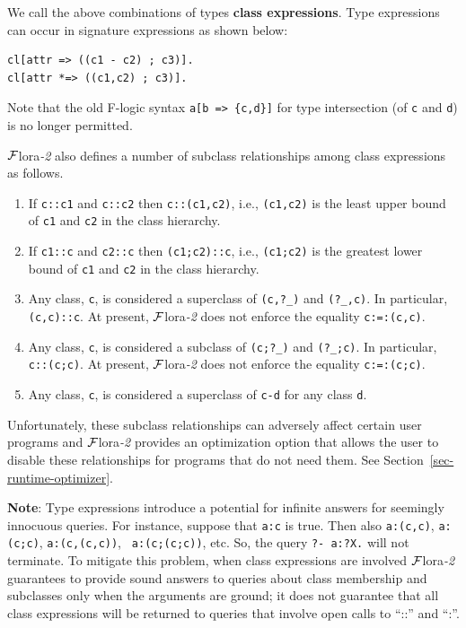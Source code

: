 \documentclass[11pt]{article}
\newcommand{\Mvd}{{\mbox{\tt \,=>\,}}}  %
\newcommand{\FLORA}{{\mbox{\sc ${\cal F}${lora}\rm\emph{-2}}}\xspace}
\newcommand{\fl}{\mbox{F-logic}\xspace}
\begin{document}
We call the above combinations of types {\bf class expressions}.  
Type expressions can occur in signature expressions as shown below:
\begin{verbatim}
cl[attr => ((c1 - c2) ; c3)].
cl[attr *=> ((c1,c2) ; c3)].
\end{verbatim}
Note that the old \fl syntax {\tt a[b\Mvd \{c,d\}]} for type intersection
(of {\tt c} and {\tt d}) is no longer permitted.

\FLORA also defines a number of subclass relationships among class
expressions as follows.
\begin{enumerate}
\item If {\tt c::c1} and {\tt c::c2} then {\tt c::(c1,c2)}, i.e.,
  {\tt (c1,c2)} is the least upper bound of {\tt c1} and {\tt c2} in the
  class hierarchy.
\item If {\tt c1::c} and {\tt c2::c} then {\tt (c1;c2)::c}, i.e.,
  {\tt (c1;c2)} is the greatest lower bound of {\tt c1} and {\tt c2} in the
  class hierarchy. 
\item Any class, {\tt c}, is considered a superclass of {\tt (c,?\_)} and
  {\tt (?\_,c)}. In particular, {\tt (c,c)::c}. At present, \FLORA does not
  enforce the equality {\tt c:=:(c,c)}.      
\item Any class, {\tt c}, is considered a subclass of {\tt (c;?\_)} and
  {\tt (?\_;c)}. In particular, {\tt c::(c;c)}. At present, \FLORA does not
  enforce the equality {\tt c:=:(c;c)}.      
\item Any class, {\tt c}, is considered a superclass of {\tt c-d} for any
  class {\tt d}.   
\end{enumerate}
Unfortunately, these subclass relationships can adversely affect certain user
programs and \FLORA provides an optimization option that allows the user to
disable these relationships for programs that do not need them. See
Section~\ref{sec-runtime-optimizer}.

{\bf Note}: Type expressions introduce a potential for infinite answers
for seemingly innocuous queries. For instance, suppose that {\tt a:c} is
true. Then also {\tt a:(c,c)}, {\tt a:(c;c)}, {\tt a:(c,(c,c))}, {\tt
  a:(c;(c;c))}, etc. So, the query {\tt ?- a:?X.} will not terminate.
To mitigate this problem, when class expressions are involved
\FLORA guarantees to provide sound answers to queries about class
membership and subclasses only when the arguments are ground; it does
not guarantee that all class expressions will be returned to 
queries that involve open calls to ``::'' and ``:''.
\end{document}
